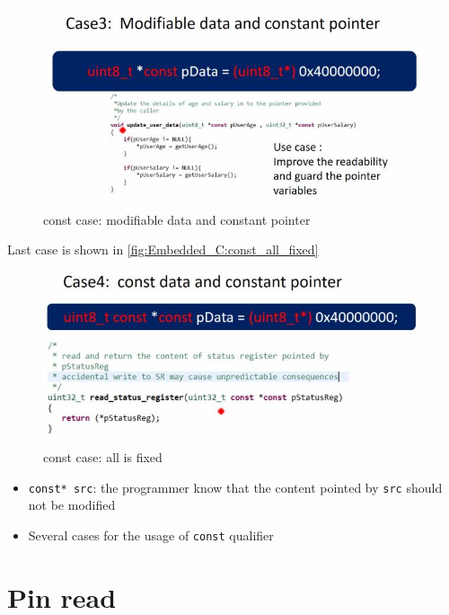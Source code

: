 \begin{figure}[h]
\centering
\includegraphics[scale=0.7]{Figures/Embedded_C/const_fixed_ptr_change_data}
\caption{const case: modifiable data and constant pointer }
\label{fig:Embedded_C:const_fixed_ptr_change_data}
\end{figure} 

\newpage
Last case is shown in \autoref{fig:Embedded_C:const_all_fixed}

\begin{figure}[h]
\centering
\includegraphics[scale=0.7]{Figures/Embedded_C/const_all_fixed}
\caption{const case: all is fixed}
\label{fig:Embedded_C:const_all_fixed}
\end{figure} 



\begin{itemize}
    \item \verb|const* src|: the programmer know that the content pointed by \verb|src| should not be modified
    
    \item Several cases for the usage of \verb|const| qualifier
    
    
\end{itemize}


\newpage    
\section{Pin read}
\label{Sec:Pin_read}

